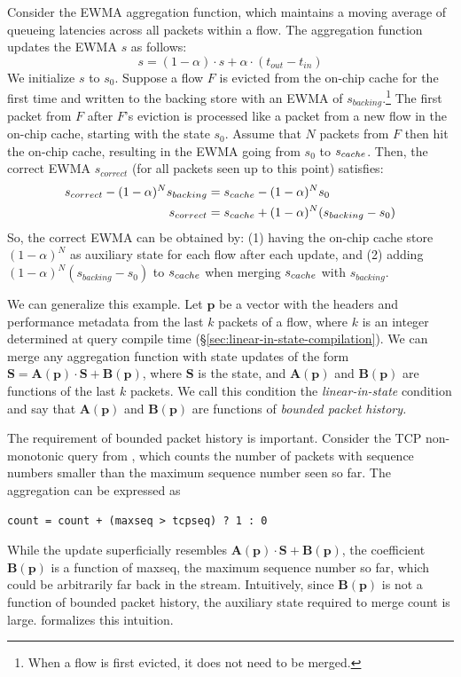 Consider the EWMA aggregation function, which maintains a moving
average of queueing latencies across all packets within a flow. The aggregation
function updates the EWMA $s$ as follows:
\[ s = (1 - \alpha) \cdot s + \alpha \cdot (t_{out} - t_{in}) \]
We initialize $s$ to $s_0$. Suppose a flow $F$
is evicted from the on-chip cache for the first time and written to the backing
store with an EWMA of $s_{backing}$.\footnote{When a flow is first evicted, it does
not need to be merged.} The first packet from $F$ after $F$'s eviction is
processed like a packet from a new flow in the on-chip cache, starting with the
state $s_0$. Assume that $N$ packets from $F$ then hit the on-chip cache,
resulting in the EWMA going from $s_0$ to $s_{cache}$.
Then, the correct EWMA $s_{correct}$ (\ie for all packets seen up to this point) satisfies:
\begin{align*}
s_{correct} - (1-\alpha)^N s_{backing} &= s_{cache} - (1-\alpha)^N s_0 \\
s_{correct} &= s_{cache} + (1-\alpha)^N(s_{backing} - s_0)
\end{align*}
So, the correct EWMA can be obtained by: (1) having the on-chip cache store
$(1-\alpha)^N$ as auxiliary state for each flow after each update, and
(2) adding $(1-\alpha)^N(s_{backing} - s_0)$ to $s_{cache}$ when merging
$s_{cache}$ with $s_{backing}$.

We can generalize this example. Let $\mathbf{p}$ be a
vector with the headers and performance metadata from the last $k$
packets of a flow, where $k$ is an integer determined at query
compile time (\S\ref{sec:linear-in-state-compilation}).
We can merge any aggregation function with state updates of the form
$\boldsymbol{S} = \boldsymbol{A}(\mathbf{p}) \cdot
\boldsymbol{S} + \boldsymbol{B}(\mathbf{p})$, where
$\boldsymbol{S}$ is the state, and
$\boldsymbol{A}(\mathbf{p})$ and $\boldsymbol{B}(\mathbf{p})$ are
functions of the last $k$ packets. We call this condition the
{\em linear-in-state} condition and say that $\boldsymbol{A}(\mathbf{p})$
and $\boldsymbol{B}(\mathbf{p})$ are functions of {\em
bounded packet history.}

The requirement of bounded packet history is important.
Consider the TCP non-monotonic query from , which
counts the number of packets with sequence numbers smaller than the maximum
sequence number seen so far. The aggregation can be expressed as
\begin{lstlisting}
count = count + (maxseq > tcpseq) ? 1 : 0
\end{lstlisting}
While the update superficially resembles $\boldsymbol{A}(\mathbf{p}) \cdot \boldsymbol{S} +
\boldsymbol{B}(\mathbf{p})$, the coefficient $\boldsymbol{B}(\mathbf{p})$ is a function of {\ct
maxseq}, the maximum sequence number so far, which could be arbitrarily far
back in the stream.
%
Intuitively, since $\boldsymbol{B}(\mathbf{p})$ is not a function of bounded packet history,
the auxiliary state required to merge {\ct count} is large.
 formalizes this intuition.

